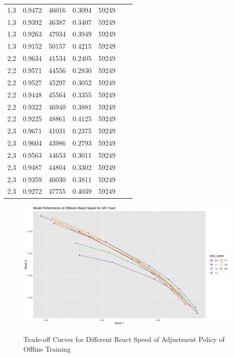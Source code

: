 \documentclass{article}
\begin{document}
\begin{longtable}[htbp]{l|l|l|*{4}{c}}
    1,3 & 0.9472 & 46016 & 0.3094 & 59249\\
    1,3 & 0.9392 & 46387 & 0.3407 & 59249\\
    1,3 & 0.9263 & 47934 & 0.3949 & 59249\\
    1,3 & 0.9152 & 50157 & 0.4215 & 59249\\
    2,2 & 0.9634 & 41534 & 0.2405 & 59249\\
    2,2 & 0.9571 & 44556 & 0.2830 & 59249\\
    2,2 & 0.9527 & 45297 & 0.3052 & 59249\\
    2,2 & 0.9448 & 45564 & 0.3355 & 59249\\
    2,2 & 0.9322 & 46940 & 0.3881 & 59249\\
    2,2 & 0.9225 & 48861 & 0.4125 & 59249\\
    2,3 & 0.9671 & 41031 & 0.2375 & 59249\\
    2,3 & 0.9604 & 43986 & 0.2793 & 59249\\
    2,3 & 0.9563 & 44653 & 0.3011 & 59249\\
    2,3 & 0.9487 & 44804 & 0.3302 & 59249\\
    2,3 & 0.9359 & 46030 & 0.3811 & 59249\\
    2,3 & 0.9272 & 47755 & 0.4039 & 59249\\
\end{longtable}

\begin{figure}
    \caption{Trade-off Curves for Different React Speed of Adjustment Policy of Offline Training}
    \centering
    \includegraphics{images/ModelPerformanceatDifferentReactSpeedforAR1fixed.png}
    \label{fig:fig1.8.2}
\end{figure}
\end{document}
